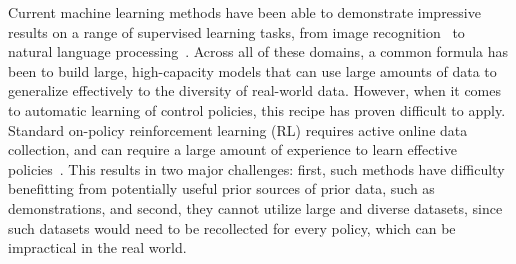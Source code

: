 

Current machine learning methods have been able to demonstrate impressive results on a range of supervised learning tasks, from image recognition~\citep{krizhevsky2012imagenet} to natural language processing~\citep{vaswani2017transformers}. 
Across all of these domains, a common formula has been to build large, high-capacity models that can use large amounts of data to generalize effectively to the diversity of real-world data. 
However, when it comes to automatic learning of control policies, this recipe has proven difficult to apply. 
Standard on-policy reinforcement learning (RL) requires active online data collection, and can require a large amount of experience to learn effective policies~\cite{}.
This results in two major challenges: first, such methods have difficulty benefitting from potentially useful prior sources of prior data, such as demonstrations, and second, they cannot utilize large and diverse datasets, since such datasets would need to be recollected for every policy, which can be impractical in the real world.

